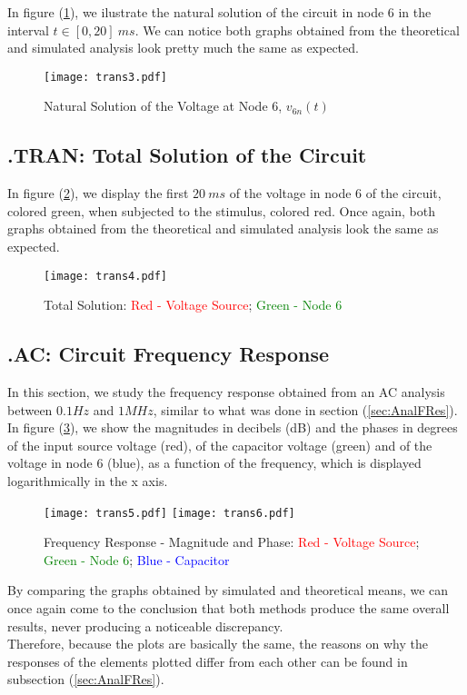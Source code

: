 In figure (\ref{fig:SimNatSol}), we ilustrate the natural solution of the circuit in node 6 in
the interval $t \in [0,20] \: ms$. We can notice both graphs obtained from the theoretical and simulated
analysis look pretty much the same as expected.

\begin{figure}[H] \centering
    \texttt{[image: trans3.pdf]}
    \caption{Natural Solution of the Voltage at Node 6, $v_{6n}(t)$}
    \label{fig:SimNatSol}
\end{figure}



\subsection{.TRAN: Total Solution of the Circuit}

In figure (\ref{fig:SimTotSol}), we display the first $20 \:ms$ of the voltage in node 6 of the circuit, colored green,
when subjected to the stimulus, colored red. Once again, both graphs obtained from the theoretical
and simulated analysis look the same as expected.

\begin{figure}[H] \centering
    \texttt{[image: trans4.pdf]}
    \caption{Total Solution: \textcolor{red}{Red - Voltage Source}; \textcolor{green}{Green - Node 6}}
    \label{fig:SimTotSol}
\end{figure}



\subsection{.AC: Circuit Frequency Response}

In this section, we study the frequency response obtained from an
AC analysis between $0.1 Hz$ and $1 MHz$, similar to what was done in section (\ref{sec:AnalFRes}).
\\
In figure (\ref{fig:FrequencyResponseSim}), we show the magnitudes in decibels (dB) and the phases in degrees
of the input source voltage (red), of the capacitor
voltage (green) and of the voltage in node 6 (blue), as a function of the frequency, which is displayed logarithmically
in the x axis.

\begin{figure}[H]
    \centering
    \texttt{[image: trans5.pdf]}
    \texttt{[image: trans6.pdf]}
    \caption{Frequency Response - Magnitude and Phase: \textcolor{red}{Red - Voltage Source}; \textcolor{green}{Green - Node 6}; \textcolor{blue}{Blue - Capacitor}}
    \label{fig:FrequencyResponseSim}
\end{figure}

By comparing the graphs obtained by simulated and theoretical means, we can once again come to the conclusion that
both methods produce the same overall results, never producing a noticeable discrepancy.
\\
Therefore, because the plots are basically the same, the reasons on why the responses of the elements plotted differ
from each other can be found in subsection (\ref{sec:AnalFRes}).